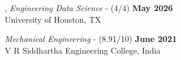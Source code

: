 \vspace{-.005em}

, \textit{Engineering Data Science} - (4/4)%
\hfill \textbf{May 2026}
\\{\small University of Houston, TX}

\textit{Mechanical Engineering} - {(8.91/10)} \hfill	\textbf{June 2021} \\{\small V R Siddhartha Engineering College, India}  


\vspace{-.45em}

